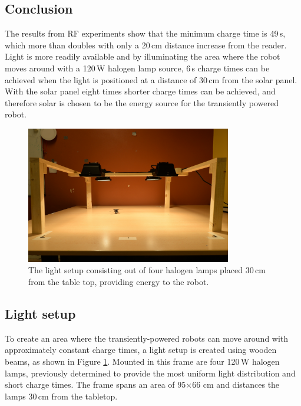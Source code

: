 \subsection{Conclusion}

The results from RF experiments show that the minimum charge time is 49\,s, which more than doubles with only a 20\,cm distance increase from the reader.
Light is more readily available and by illuminating the area where the robot moves around with a 120\,W halogen lamp source, 6\,s charge times can be achieved when the light is positioned at a distance of 30\,cm from the solar panel.
With the solar panel eight times shorter charge times can be achieved, and therefore solar is chosen to be the energy source for the transiently powered robot.

\begin{figure}[!ht]
	\centering
	\includegraphics[width=0.8\textwidth]{pics/light_setup.jpg}
	\caption{The light setup consisting out of four halogen lamps placed 30\,cm from the table top, providing energy to the robot.}
	\label{fig:light_setup}
\end{figure}

\subsection{Light setup}

To create an area where the transiently-powered robots can move around with approximately constant charge times, a light setup is created using wooden beams, as shown in Figure \ref{fig:light_setup}.
Mounted in this frame are four 120\,W halogen lamps, previously determined to provide the most uniform light distribution and short charge times.
The frame spans an area of 95$\times$66 cm and distances the lamps 30\,cm from the tabletop.

